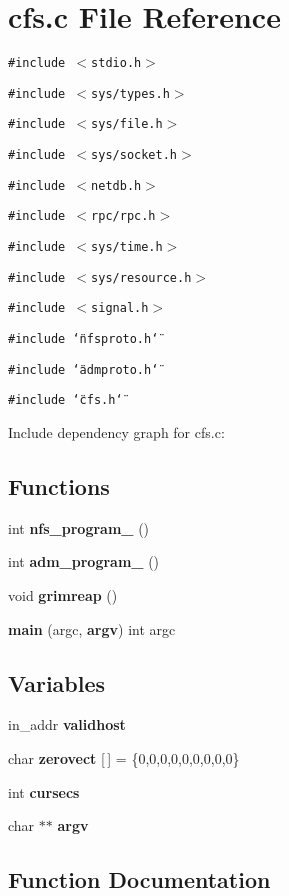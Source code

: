\section{cfs.c File Reference}
\label{cfs_8c}


{\tt \#include $<$stdio.h$>$}\par
{\tt \#include $<$sys/types.h$>$}\par
{\tt \#include $<$sys/file.h$>$}\par
{\tt \#include $<$sys/socket.h$>$}\par
{\tt \#include $<$netdb.h$>$}\par
{\tt \#include $<$rpc/rpc.h$>$}\par
{\tt \#include $<$sys/time.h$>$}\par
{\tt \#include $<$sys/resource.h$>$}\par
{\tt \#include $<$signal.h$>$}\par
{\tt \#include \char`\"{}nfsproto.h\char`\"{}}\par
{\tt \#include \char`\"{}admproto.h\char`\"{}}\par
{\tt \#include \char`\"{}cfs.h\char`\"{}}\par


Include dependency graph for cfs.c:\subsection*{Functions}
\begin{CompactItemize}
\item 
int {\bf nfs\_\-program\_} ()
\item 
int {\bf adm\_\-program\_} ()
\item 
void {\bf grimreap} ()
\item 
{\bf main} (argc, {\bf argv}) int argc
\end{CompactItemize}
\subsection*{Variables}
\begin{CompactItemize}
\item 
in\_\-addr {\bf validhost}
\item 
char {\bf zerovect} [$\,$] = \{0,0,0,0,0,0,0,0,0\}
\item 
int {\bf cursecs}
\item 
char $\ast$$\ast$ {\bf argv}
\end{CompactItemize}


\subsection{Function Documentation}
